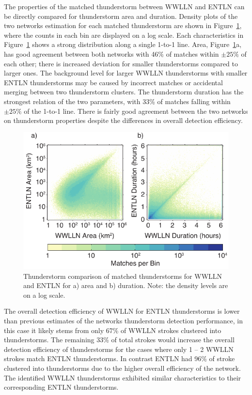 The properties of the matched thunderstorm  between WWLLN and ENTLN can be directly compared for thunderstorm area and duration.
Density plots of the two networks estimation for each matched thunderstorm are shown in Figure~\ref{deSim}, where the counts in each bin are displayed on a log scale.
Each characteristics in Figure~\ref{deSim} shows a strong distribution along a single 1-to-1 line.
Area, Figure~\ref{deSim}a, has good agreement between both networks with 46\% of matches within $\pm25\%$ of each other; there is increased deviation for smaller thunderstorms compared to larger ones.
The background level for larger WWLLN thunderstorms with smaller ENTLN thunderstorms may be caused by incorrect matches or accidental merging between two thunderstorm clusters.
The thunderstorm duration has the strongest relation of the two parameters, with 33\% of matches falling within $\pm25\%$ of the 1-to-1 line.
There is fairly good agreement between the two networks on thunderstorm properties despite the differences in overall detection efficiency.

\begin{figure}[ht!]
   \centering
   \includegraphics[scale=1]{thunderstorm/Figures/deSim.pdf}
   \caption{Thunderstorm comparison of matched thunderstorms for WWLLN and ENTLN for a) area and b) duration.
           Note: the density levels are on a log scale.}
   \label{deSim}
\end{figure}


The overall detection efficiency of WWLLN for ENTLN thunderstorms is lower than previous estimates of the networks thunderstorm detection performance, in this case it likely stems from only 67\% of WWLLN strokes clustered into thunderstorms.
The remaining 33\% of total strokes would increase the overall detection efficiency of thunderstorms for the cases where only 1 -- 2 WWLLN strokes match ENTLN thunderstorms.
In contrast ENTLN had 96\% of stroke clustered into thunderstorms due to the higher overall efficiency of the network.
The identified WWLLN thunderstorms exhibited similar characteristics to their corresponding ENTLN thunderstorms.

